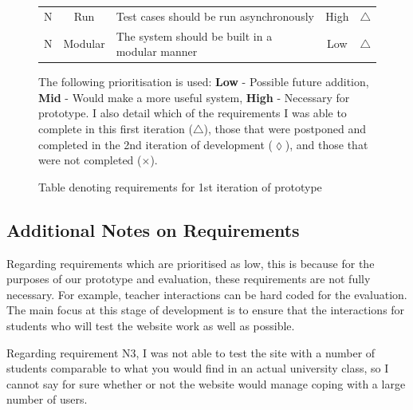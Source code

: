 \documentclass[a4paper,11pt]{report}
\newcounter{FunCount}
\newcounter{NFunCount}
\newcommand{\nfreq}[4]{\addtocounter{NFunCount}{1}N\arabic{NFunCount} & #1 & #2 & #3 & #4\\}
\begin{document}
\begin{figure}
\begin{longtable}{ccl@{}cc}
\nfreq{Run}{Test cases should be run asynchronously}{High}{$\triangle$}
\nfreq{Modular}{The system should be built in a modular manner}{Low}{$\triangle$}
\end{longtable}
\vspace{0.5cm}
The following prioritisation is used: \textbf{Low} - Possible future addition, \textbf{Mid} - Would make a more useful system, \textbf{High} - Necessary for prototype. I also detail which of the requirements I was able to complete in this first iteration ($\triangle$), those that were postponed and completed in the 2nd iteration of development ($\lozenge$), and those that were not completed ($\times$).
\label{tab:protoreq1}
\caption{Table denoting requirements for 1st iteration of prototype}
\end{figure}

\subsection{Additional Notes on Requirements}
Regarding requirements which are prioritised as low, this is because for the purposes of our prototype and evaluation, these requirements are not fully necessary. For example, teacher interactions can be hard coded for the evaluation. The main focus at this stage of development is to ensure that the interactions for students who will test the website work as well as possible.\par
Regarding requirement N3, I was not able to test the site with a number of students comparable to what you would find in an actual university class, so I cannot say for sure whether or not the website would manage coping with a large number of users.
\end{document}
